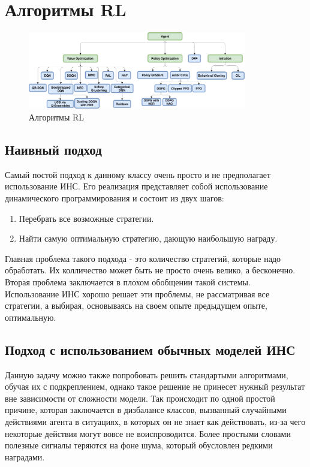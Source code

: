 \documentclass[bachelor, och, coursework]{shiza}
\begin{document}
\section{Алгоритмы RL}
\begin{figure}[H]
    \centering
    \includegraphics[width=0.85\textwidth]{pic/9}
    \caption{Алгоритмы RL}
    \label{fig:img1}
\end{figure}
\subsection{Наивный подход}
Самый постой подход к данному классу очень просто и не предполагает использование ИНС. Его реализация представляет собой использование динамического программирования и
состоит из двух шагов:
\begin{enumerate}
    \item Перебрать все возможные стратегии.
    \item Найти самую оптимальную стратегию, дающую наибольшую награду.
\end{enumerate}
Главная проблема такого подхода - это количество стратегий, которые надо обработать. Их колличество может быть не просто очень велико, а бесконечно. Вторая проблема
заключается в плохом обобщении такой системы. Использование ИНС хорошо решает эти проблемы, не рассматривая все стратегии, а выбирая, основываясь на своем опыте
предыдущем опыте, оптимальную.
\subsection{Подход с использованием обычных моделей ИНС}
Данную задачу можно также попробовать решить стандартыми алгоритмами, обучая их с подкреплением, однако такое решение не принесет нужный результат вне зависимости от сложности модели.
Так происходит по одной простой причине, которая заключается в дизбалансе классов, вызванный случайными действиями агента в ситуациях, в которых он не знает как действовать,
из-за чего некоторые действия могут вовсе не воиспроводится. Более простыми словами полезные сигналы теряются на фоне шума, который обусловлен редкими наградами.
\end{document}
